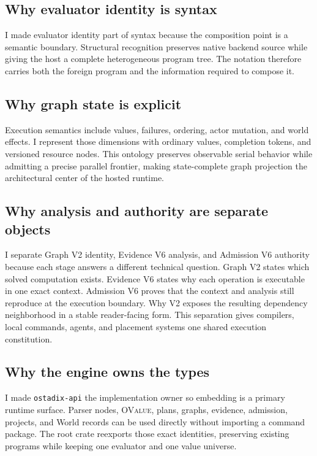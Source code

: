 \documentclass[11pt,oneside]{article}
\newcommand{\ovalue}{\textsc{OValue}}
\begin{document}
\subsection{Why evaluator identity is syntax}

I made evaluator identity part of syntax because the composition point is a
semantic boundary. Structural recognition preserves native backend source
while giving the host a complete heterogeneous program tree. The notation
therefore carries both the foreign program and the information required to
compose it.

\subsection{Why graph state is explicit}

Execution semantics include values, failures, ordering, actor mutation, and
world effects. I represent those dimensions with ordinary values, completion
tokens, and versioned resource nodes. This ontology preserves observable
serial behavior while admitting a precise parallel frontier, making
state-complete graph projection the architectural center of the hosted
runtime.

\subsection{Why analysis and authority are separate objects}

I separate Graph V2 identity, Evidence V6 analysis, and Admission V6 authority
because each stage answers a different technical question. Graph V2 states
which solved computation exists. Evidence V6 states why each operation is
executable in one exact context. Admission V6 proves that the context and
analysis still reproduce at the execution boundary. Why V2 exposes the
resulting dependency neighborhood in a stable reader-facing form. This
separation gives compilers, local commands, agents, and placement systems one
shared execution constitution.

\subsection{Why the engine owns the types}

I made \texttt{ostadix-api} the implementation owner so embedding is a primary
runtime surface. Parser nodes, \ovalue{}, plans, graphs, evidence, admission,
projects, and World records can be used directly without importing a command
package. The root crate reexports those exact identities, preserving existing
programs while keeping one evaluator and one value universe.
\end{document}
